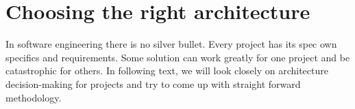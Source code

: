 

\chapter{Choosing the right architecture}
In software engineering there is no silver bullet. Every project has its spec own specifics and requirements. Some solution can work greatly for one project and be catastrophic for others. In following text, we will look closely on architecture decision-making for projects and try to come up with straight forward methodology.


